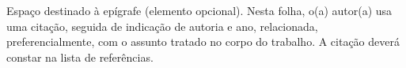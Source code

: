 
\begin{epigrafe}%

    \vspace*{\fill}
    \begin{flushright}

        Espaço destinado à epígrafe (elemento opcional). Nesta folha, o(a) autor(a) usa uma citação, seguida
        de indicação de autoria e ano, relacionada, preferencialmente, com o assunto tratado no corpo do
        trabalho. A citação deverá constar na lista de referências.
        
    \end{flushright}

\end{epigrafe}
    